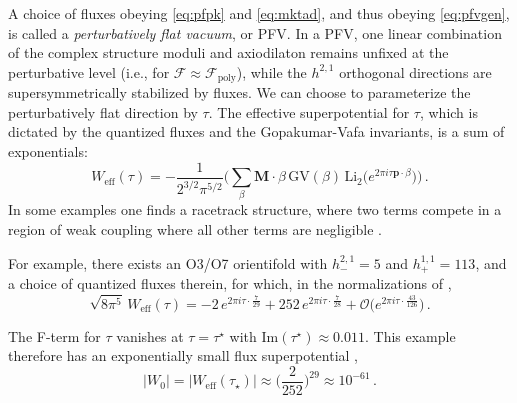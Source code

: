 \documentclass[12pt,a4wide]{article}
\begin{document}
A choice of fluxes obeying \eqref{eq:pfpk} and \eqref{eq:mktad}, and thus obeying \eqref{eq:pfvgen}, is called a \emph{perturbatively flat vacuum}, or PFV.
In a PFV, one linear combination of the complex structure moduli and axiodilaton remains unfixed at the perturbative level (i.e., for $\mathcal{F} \approx \mathcal{F}_{\text{poly}}$), while the $h^{2,1}$ orthogonal directions are supersymmetrically stabilized by fluxes. We can choose to parameterize the perturbatively flat direction by $\tau$.  The effective superpotential for $\tau$, which is dictated by the quantized fluxes and the Gopakumar-Vafa invariants, is a sum of exponentials:
\begin{equation}\label{eq:weffgv}
     W_{\text{eff}}(\tau) = -\frac{1}{2^{3/2}\pi^{5/2}}\biggl( 
     \sum_\beta \mathbf{M}{\cdot}\beta\,\text{GV}(\beta)\,\text{Li}_2\bigl(e^{2\pi i \tau \mathbf{p}\cdot \beta} \bigr) \biggr)\,.
\end{equation}
In some examples one finds a racetrack structure, where two terms compete in a region of weak coupling where all other terms are negligible \cite{Demirtas:2019sip}.

For example, there exists an O3/O7 orientifold with $h^{2,1}_-=5$ and $h^{1,1}_+=113$, and a choice of quantized fluxes therein, for which, in the normalizations of \cite{Demirtas:2021nlu},
\begin{equation} 
   \sqrt{8\pi^5}\, W_{\text{eff}}(\tau) = - 2\,e^{2\pi i \tau \cdot \frac{7}{29}} + 252\,e^{2\pi i \tau \cdot \frac{7}{28}} + \mathcal{O}\bigl(e^{2\pi i \tau \cdot \frac{43}{126}}\bigr)\,.
\end{equation} 

The F-term for $\tau$ vanishes at $\tau= \tau^{\star}$ with $\text{Im}(\tau^\star) \approx 0.011$.
This example therefore has an exponentially small flux superpotential 
\cite{Demirtas:2021ote,Demirtas:2021nlu},
\begin{equation}\label{eq:example5113}
|W_0| = |W_{\text{eff}}(\tau_\star)| \approx \biggl(\frac{2}{252}\biggr)^{29} \approx 10^{-61}\,.
\end{equation}
  
\end{document}
